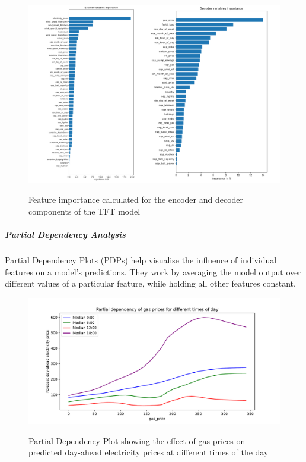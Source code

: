 \documentclass[a4paper]{article}
\begin{document}
    \begin{figure}
\centering
{\includegraphics[keepaspectratio]{src/encoder_decoder_feat_imp.pdf}}
\caption{Feature importance calculated for the encoder and decoder
components of the TFT model}
\end{figure}

    \subparagraph{Partial Dependency
Analysis}\label{partial-dependency-analysis}

Partial Dependency Plots (PDPs) help visualise the influence of
individual features on a model's predictions. They work by averaging the
model output over different values of a particular feature, while
holding all other features constant.

    \begin{figure}
\centering
{\includegraphics[keepaspectratio]{src/tft_pdp_gas_price.pdf}}
\caption{Partial Dependency Plot showing the effect of gas prices on
predicted day-ahead electricity prices at different times of the day}
\end{figure}
\end{document}
